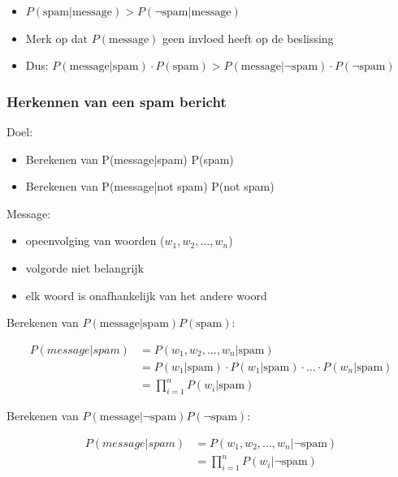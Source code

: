 \documentclass{article}
\begin{document}
\begin{itemize}
    \item $P(\text{spam} | \text{message}) > P(\neg \text{spam} | \text{message})$
    \item Merk op dat $P(\text{message})$ geen invloed heeft op de beslissing
    \item Dus: $P(\text{message}|\text{spam}) \cdot P(\text{spam}) > P(\text{message}|\neg \text{spam}) \cdot P(\neg \text{spam})$
\end{itemize}

\subsubsection{Herkennen van een spam bericht}

Doel:

\begin{itemize}
    \item Berekenen van P(message|spam) P(spam)
    \item Berekenen van P(message|not spam) P(not spam)
\end{itemize}

Message:

\begin{itemize}
    \item opeenvolging van woorden ($w_1, w_2, \dots, w_n$)
    \item volgorde niet belangrijk
    \item elk woord is onafhankelijk van het andere woord
\end{itemize}

Berekenen van $P(\text{message}|\text{spam}) P(\text{spam})$:

\begin{align*}
    P(message|spam) & = P(w_1, w_2, \dots, w_n | \text{spam})\\
    & = P(w_1 | \text{spam}) \cdot P(w_1 | \text{spam}) \cdot \dots \cdot P(w_n | \text{spam})\\
    & = \prod_{i=1}^n P(w_i | \text{spam})
\end{align*}

Berekenen van $P(\text{message}|\neg \text{spam}) P(\neg \text{spam})$:

\begin{align*}
    P(message|spam) & = P(w_1, w_2, \dots, w_n |\neg \text{spam})\\
    & = \prod_{i=1}^n P(w_i | \neg \text{spam})
\end{align*}
\end{document}
